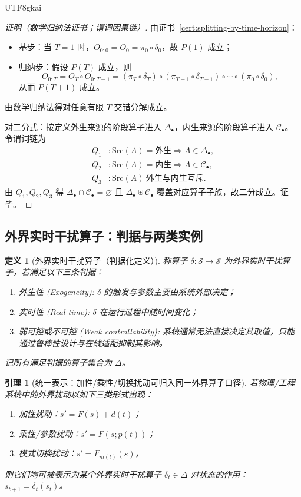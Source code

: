 \documentclass[12pt]{article}
\newtheorem{definition}{定义}[section]
\newtheorem{lemma}{引理}[section]
\begin{document}
\begin{CJK*}{UTF8}{gkai}
\begin{proof}[证明（数学归纳法证书；谓词因果链）]
由证书~\ref{cert:splitting-by-time-horizon}：
\begin{itemize}
  \item 基步：当 $T=1$ 时，$O_{0:0}=O_0=\pi_0\circ\delta_0$，故 $P(1)$ 成立；
  \item 归纳步：假设 $P(T)$ 成立，则
  \[
    O_{0:T}
    = O_T\circ O_{0:T-1}
    = (\pi_T\circ\delta_T)\circ(\pi_{T-1}\circ\delta_{T-1})\circ\cdots\circ(\pi_0\circ\delta_0),
  \]
  从而 $P(T+1)$ 成立。
\end{itemize}
由数学归纳法得对任意有限 $T$ 交错分解成立。

对二分式：按定义外生来源的阶段算子进入 $\Delta_{\bullet}$，内生来源的阶段算子进入 $\mathcal{C}_{\bullet}$。
令谓词链为
\[
\begin{aligned}
  Q_1 &: \mathrm{Src}(A)=\text{外生}\Rightarrow A\in\Delta_{\bullet},\\
  Q_2 &: \mathrm{Src}(A)=\text{内生}\Rightarrow A\in\mathcal{C}_{\bullet},\\
  Q_3 &: \mathrm{Src}(A)\ \text{外生与内生互斥}.
\end{aligned}
\]
由 $Q_1,Q_2,Q_3$ 得 $\Delta_{\bullet}\cap \mathcal{C}_{\bullet}=\varnothing$ 且 $\Delta_{\bullet}\uplus\mathcal{C}_{\bullet}
  $ 覆盖对应算子子族，故二分成立。证毕。
\end{proof}

\subsection{外界实时干扰算子：判据与两类实例}
\label{sec:disturbance-operators}

\begin{definition}[外界实时干扰算子（判据化定义）]
称算子 $\delta:\mathcal{S}\to\mathcal{S}$ 为外界实时干扰算子，若满足以下三条判据：
\begin{enumerate}
  \item 外生性 (Exogeneity): $\delta$ 的触发与参数主要由系统外部决定；
  \item 实时性 (Real-time): $\delta$ 在运行过程中随时间变化；
  \item 弱可控或不可控 (Weak controllability): 系统通常无法直接决定其取值，只能通过鲁棒性设计与在线适配抑制其影响。
\end{enumerate}
记所有满足判据的算子集合为 $\Delta$。
\end{definition}

\begin{lemma}[统一表示：加性/乘性/切换扰动可归入同一外界算子口径]
\label{lem:disturbance-unified-representation}
若物理/工程系统中的外界扰动以如下三类形式出现：
\begin{enumerate}
  \item 加性扰动：$s' = F(s) + d(t)$；
  \item 乘性/参数扰动：$s' = F(s;p(t))$；
  \item 模式切换扰动：$s' = F_{m(t)}(s)$，
\end{enumerate}
则它们均可被表示为某个外界实时干扰算子 $\delta_t\in\Delta$ 对状态的作用：$s_{t+1}=\delta_t(s_t)$。
\end{lemma}


\end{CJK*}
\end{document}
